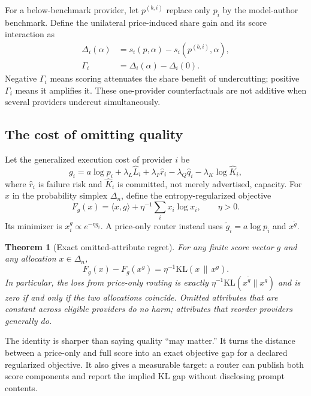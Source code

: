 \documentclass[sigconf,nonacm]{acmart}
\newtheorem{theorem}{Theorem}
\newcommand{\1}{\mathbf 1}
\newcommand{\KL}{\mathrm{KL}}
\begin{document}
For a below-benchmark provider, let $p^{(b,i)}$ replace only $p_i$ by the
model-author benchmark.  Define the unilateral price-induced share gain and its
score interaction as
\begin{align}
\Delta_i(\alpha)&=s_i(p,\alpha)-s_i(p^{(b,i)},\alpha),\\
\Gamma_i&=\Delta_i(\alpha)-\Delta_i(0).
\label{eq:interaction}
\end{align}
Negative $\Gamma_i$ means scoring attenuates the share benefit of undercutting;
positive $\Gamma_i$ means it amplifies it.  These one-provider counterfactuals
are not additive when several providers undercut simultaneously.

\subsection{The cost of omitting quality}

Let the generalized execution cost of provider $i$ be
\begin{equation}
g_i=a\log p_i+\lambda_L\widehat L_i+\lambda_F\widehat r_i
-\lambda_Q\widehat q_i-\lambda_K\log \widehat K_i,
\label{eq:score}
\end{equation}
where $\widehat r_i$ is failure risk and $\widehat K_i$ is committed, not merely
advertised, capacity.  For $x$ in the probability simplex $\Delta_n$, define the
entropy-regularized objective
\begin{equation}
F_g(x)=\langle x,g\rangle+\eta^{-1}\sum_i x_i\log x_i,
\qquad \eta>0.
\label{eq:gibbsobjective}
\end{equation}
Its minimizer is $x_i^g\propto e^{-\eta g_i}$.  A price-only router instead uses
$\tilde g_i=a\log p_i$ and $x^{\tilde g}$.

\begin{theorem}[Exact omitted-attribute regret]
\label{thm:kl}
For any finite score vector $g$ and any allocation $x\in\Delta_n$,
\begin{equation}
F_g(x)-F_g(x^g)=\eta^{-1}\KL(x\,\|\,x^g).
\label{eq:klidentity}
\end{equation}
In particular, the loss from price-only routing is exactly
$\eta^{-1}\KL(x^{\tilde g}\|x^g)$ and is zero if and only if the two allocations
coincide.  Omitted attributes that are constant across eligible providers do no
harm; attributes that reorder providers generally do.
\end{theorem}

The identity is sharper than saying quality ``may matter.''  It turns the
distance between a price-only and full score into an exact objective gap for a
declared regularized objective.  It also gives a measurable target: a router can
publish both score components and report the implied KL gap without disclosing
prompt contents.
\end{document}

